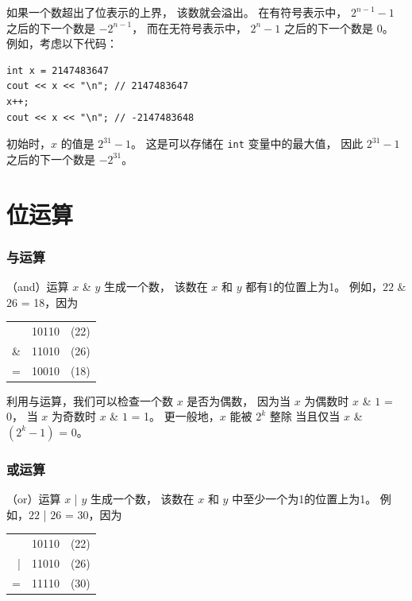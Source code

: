 如果一个数超出了位表示的上界，
该数就会溢出。
在有符号表示中，
$2^{n-1}-1$ 之后的下一个数是 $-2^{n-1}$，
而在无符号表示中，
$2^n-1$ 之后的下一个数是 $0$。
例如，考虑以下代码：
\begin{lstlisting}
int x = 2147483647
cout << x << "\n"; // 2147483647
x++;
cout << x << "\n"; // -2147483648
\end{lstlisting}

初始时，$x$ 的值是 $2^{31}-1$。
这是可以存储在 \texttt{int} 变量中的最大值，
因此 $2^{31}-1$ 之后的下一个数是 $-2^{31}$。


\section{位运算}

\newcommand\XOR{\mathbin{\char`\^}}

\subsubsection{与运算}


（and）运算 $x$ \& $y$ 生成一个数，
该数在 $x$ 和 $y$ 都有1的位置上为1。
例如，$22$ \& $26$ = 18，因为

\begin{center}
\begin{tabular}{rrr}
& 10110 & (22)\\
\& & 11010 & (26) \\
\hline
 = & 10010 & (18) \\
\end{tabular}
\end{center}

利用与运算，我们可以检查一个数 $x$ 是否为偶数，
因为当 $x$ 为偶数时 $x$ \& $1$ = 0，
当 $x$ 为奇数时 $x$ \& $1$ = 1。
更一般地，$x$ 能被 $2^k$ 整除
当且仅当 $x$ \& $(2^k-1)$ = 0。

\subsubsection{或运算}


（or）运算 $x$ | $y$ 生成一个数，
该数在 $x$ 和 $y$ 中至少一个为1的位置上为1。
例如，$22$ | $26$ = 30，因为

\begin{center}
\begin{tabular}{rrr}
& 10110 & (22)\\
| & 11010 & (26) \\
\hline
 = & 11110 & (30) \\
\end{tabular}
\end{center}


